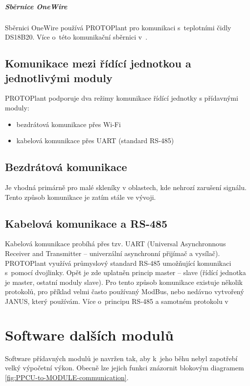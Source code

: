 \paragraph{Sběrnice OneWire}
Sběrnici OneWire používá PROTOPlant pro komunikaci s~teplotními čidly DS18B20. 
Více o~této komunikační sběrnici v~\cite{DS18B20}.

\section{Komunikace mezi řídící jednotkou a jednotlivými moduly}
PROTOPlant podporuje dva režimy komunikace řídící jednotky s přídavnými moduly:
\begin{itemize}
    \item bezdrátová komunikace přes Wi-Fi
    \item kabelová komunikace přes UART (standard RS-485)
\end{itemize}

\section{Bezdrátová komunikace}
Je vhodná primárně pro malé skleníky v oblastech, kde nehrozí zarušení signálu.
Tento způsob komunikace je zatím stále ve vývoji.

\section{Kabelová komunikace a RS-485}
Kabelová komunikace probíhá přes tzv. UART (Universal Asynchronnous Receiver and Transmitter -- univerzální asynchronní přijímač a vysílač).
PROTO\-Plant využívá průmyslový standard RS-485 umožňující komunikaci s~pomocí dvojlinky.
Opět je zde uplatněn princip master -- slave (řídící jednotka je master, ostatní moduly slave).
Pro tento způsob komunikace existuje několik protokolů, pro příklad velmi často používaný ModBus, nebo nedávno vytvořený JANUS\cite{JANUS}, který používám. 
Více o~principu RS-485 a samotném protokolu v~\cite[21-25]{JANUS}

\chapter{Software dalších modulů}

\label{chap:moduleSoftware}
Software přídavných modulů je navržen tak, aby k~jeho běhu nebyl zapotřebí velký výpočetní výkon.
Obecně lze jejich funkci znázornit blokovým diagramem \ref{fig:PPCU-to-MODULE-communication}.

